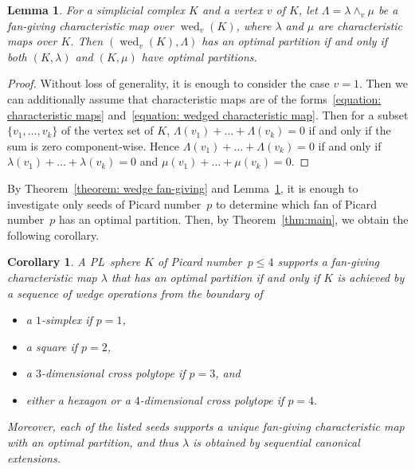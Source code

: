 \documentclass[11pt]{amsart}
\theoremstyle{plain}
\newtheorem{lemma}[theorem]{Lemma}
\newtheorem{corollary}[theorem]{Corollary}
\numberwithin{equation}{section}
\theoremstyle{definition}
\DeclareMathOperator{\wed}{wed}
\begin{document}
\begin{lemma} \label{lemma: wedge optimal partition}
	For a simplicial complex $K$ and a vertex $v$ of $K$, let $\Lambda = \lambda \wedge_v \mu$ be a fan-giving characteristic map over $\wed_v(K)$, where $\lambda$ and $\mu$ are characteristic maps over $K$.
	Then $(\wed_v(K), \Lambda)$ has an optimal partition if and only if both $(K, \lambda)$ and $(K, \mu)$ have optimal partitions.
\end{lemma}

\begin{proof}
	Without loss of generality, it is enough to consider the case $v=1$.
	Then we can additionally assume that characteristic maps are of the forms~\eqref{equation: characteristic maps} and~\eqref{equation: wedged characteristic map}.
	Then for a subset $\{v_1, \ldots, v_k\}$ of the vertex set of $K$, $\Lambda(v_1) + \dots + \Lambda(v_k) = 0$ if and only if the sum is zero component-wise.
	Hence $\Lambda(v_1) + \dots + \Lambda(v_k) = 0$ if and only if $\lambda(v_1) + \dots + \lambda(v_k) = 0$ and $\mu(v_1) + \dots + \mu(v_k) = 0$.
\end{proof}

By Theorem~\ref{theorem: wedge fan-giving} and Lemma~\ref{lemma: wedge optimal partition}, it is enough to investigate only seeds of Picard number~$p$ to determine which fan of Picard number~$p$ has an optimal partition.
Then, by Theorem~\ref{thm:main}, we obtain the following corollary.
\begin{corollary}\label{corollary:min_comp}
	A PL~sphere $K$ of Picard number~$p \leq 4$ supports a fan-giving characteristic map $\lambda$ that has an optimal partition if and only if $K$ is achieved by a sequence of wedge operations from the boundary of
	\begin{itemize}
		\item a $1$-simplex if $p=1$,
		\item a square if $p=2$,
		\item a $3$-dimensional cross polytope if $p=3$, and
		\item either a hexagon or a $4$-dimensional cross polytope if $p=4$.
	\end{itemize}
	Moreover, each of the listed seeds supports a unique fan-giving characteristic map with an optimal partition, and thus $\lambda$ is obtained by sequential canonical extensions.
\end{corollary}
\end{document}
